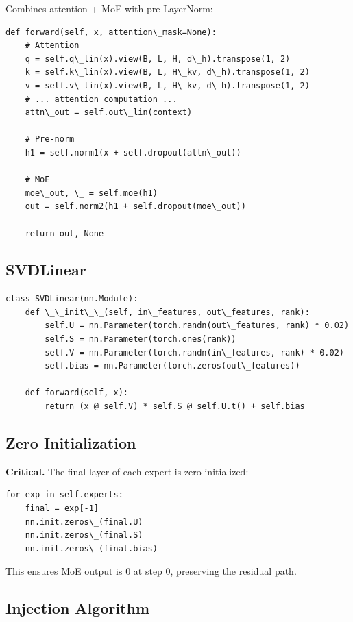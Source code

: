 Combines attention + MoE with pre-LayerNorm:

\begin{lstlisting}
def forward(self, x, attention\_mask=None):
    # Attention
    q = self.q\_lin(x).view(B, L, H, d\_h).transpose(1, 2)
    k = self.k\_lin(x).view(B, L, H\_kv, d\_h).transpose(1, 2)
    v = self.v\_lin(x).view(B, L, H\_kv, d\_h).transpose(1, 2)
    # ... attention computation ...
    attn\_out = self.out\_lin(context)
    
    # Pre-norm
    h1 = self.norm1(x + self.dropout(attn\_out))
    
    # MoE
    moe\_out, \_ = self.moe(h1)
    out = self.norm2(h1 + self.dropout(moe\_out))
    
    return out, None
\end{lstlisting}

\subsection{SVDLinear}

\begin{lstlisting}
class SVDLinear(nn.Module):
    def \_\_init\_\_(self, in\_features, out\_features, rank):
        self.U = nn.Parameter(torch.randn(out\_features, rank) * 0.02)
        self.S = nn.Parameter(torch.ones(rank))
        self.V = nn.Parameter(torch.randn(in\_features, rank) * 0.02)
        self.bias = nn.Parameter(torch.zeros(out\_features))
    
    def forward(self, x):
        return (x @ self.V) * self.S @ self.U.t() + self.bias
\end{lstlisting}

\subsection{Zero Initialization}

\textbf{Critical.} The final layer of each expert is zero-initialized:

\begin{lstlisting}
for exp in self.experts:
    final = exp[-1]
    nn.init.zeros\_(final.U)
    nn.init.zeros\_(final.S)
    nn.init.zeros\_(final.bias)
\end{lstlisting}

This ensures MoE output is 0 at step 0, preserving the residual path.

\subsection{Injection Algorithm}

